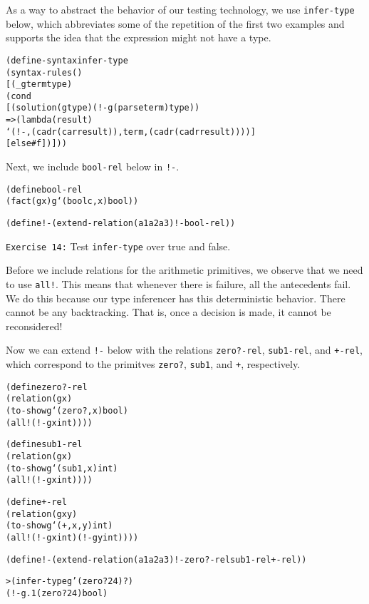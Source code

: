 As a way to abstract the behavior of our testing technology, we
use \texttt{infer-type} below, which abbreviates some of the
repetition of the first two examples and supports the idea that
the expression might not have a type.

\begin{alltt}
(define-syntax infer-type
  (syntax-rules ()
    [(_ g term type)
     (cond
       [(solution (g type) (!- g (parse term) type))
        => (lambda (result)
             `(!- ,(cadr (car result)) ,term ,(cadr (cadr result))))]
       [else #f])]))
\end{alltt}

Next, we include \texttt{bool-rel} below in \texttt{!-}.
\begin{alltt}
(define bool-rel
  (fact (g x) g `(boolc ,x) bool))

(define !- (extend-relation (a1 a2 a3) !- bool-rel))
\end{alltt}
\noindent
\texttt{Exercise 14:} Test \texttt{infer-type} over true and false.\endofexercise

Before we include relations for the arithmetic primitives, we observe
that we need to use \texttt{all!}.  This means that whenever there is
failure, all the antecedents fail.  We do this because our type
inferencer has this deterministic behavior.  There cannot be any
backtracking.  That is, once a decision is made, it cannot be
reconsidered!

Now we can extend \texttt{!-} below with the relations
\texttt{zero?-rel}, \texttt{sub1-rel}, and \texttt{+-rel}, which
correspond to the primitves \texttt{zero?}, \texttt{sub1}, and
\texttt{+}, respectively.

\begin{alltt}
(define zero?-rel
  (relation (g x)
    (to-show g `(zero? ,x) bool)
    (all! (!- g x int))))

(define sub1-rel
  (relation (g x)
    (to-show g `(sub1 ,x) int)
    (all! (!- g x int))))

(define +-rel
  (relation (g x y)
    (to-show g `(+ ,x ,y) int)
    (all! (!- g x int) (!- g y int))))
\end{alltt}

\begin{alltt}
(define !- (extend-relation (a1 a2 a3) !- zero?-rel sub1-rel +-rel))
\end{alltt}

\begin{alltt}
> (infer-type g '(zero? 24) ?)
(!- g.1 (zero? 24) bool)
\end{alltt}


